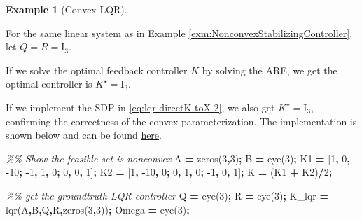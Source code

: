\documentclass[
]{book}
\newenvironment{Shaded}{\begin{snugshade}}{\end{snugshade}}
\newcommand{\CommentTok}[1]{\textcolor[rgb]{0.56,0.35,0.01}{\textit{#1}}}
\newcommand{\FloatTok}[1]{\textcolor[rgb]{0.00,0.00,0.81}{#1}}
\newcommand{\NormalTok}[1]{#1}
\newcommand{\OperatorTok}[1]{\textcolor[rgb]{0.81,0.36,0.00}{\textbf{#1}}}
\newcommand{\VariableTok}[1]{\textcolor[rgb]{0.00,0.00,0.00}{#1}}
\theoremstyle{definition}
\theoremstyle{definition}
\newtheorem{example}{Example}[chapter]
\theoremstyle{definition}
\theoremstyle{definition}
\theoremstyle{remark}
\begin{document}
\begin{example}[Convex LQR]
\protect\hypertarget{exm:ConvexLQR}{}\label{exm:ConvexLQR}

For the same linear system as in Example \ref{exm:NonconvexStabilizingController}, let \(Q = R = \mathrm{I}_3\).

If we solve the optimal feedback controller \(K\) by solving the ARE, we get the optimal controller is \(K^\star = \mathrm{I}_3\).

If we implement the SDP in \eqref{eq:lqr-directK-toX-2}, we also get \(K^\star = \mathrm{I}_3\), confirming the correctness of the convex parameterization. The implementation is shown below and can be found \href{https://github.com/ComputationalRobotics/Semidefinite-Examples/blob/main/lqr_sdp.m}{here}.

\begin{Shaded}
\begin{Highlighting}[]
\CommentTok{\%\% Show the feasible set is nonconvex}
\VariableTok{A} \OperatorTok{=} \VariableTok{zeros}\NormalTok{(}\FloatTok{3}\OperatorTok{,}\FloatTok{3}\NormalTok{)}\OperatorTok{;}
\VariableTok{B} \OperatorTok{=} \VariableTok{eye}\NormalTok{(}\FloatTok{3}\NormalTok{)}\OperatorTok{;}
\VariableTok{K1} \OperatorTok{=}\NormalTok{ [}\FloatTok{1}\OperatorTok{,} \FloatTok{0}\OperatorTok{,} \OperatorTok{{-}}\FloatTok{10}\OperatorTok{;} \OperatorTok{{-}}\FloatTok{1}\OperatorTok{,} \FloatTok{1}\OperatorTok{,} \FloatTok{0}\OperatorTok{;} \FloatTok{0}\OperatorTok{,} \FloatTok{0}\OperatorTok{,} \FloatTok{1}\NormalTok{]}\OperatorTok{;}
\VariableTok{K2} \OperatorTok{=}\NormalTok{ [}\FloatTok{1}\OperatorTok{,} \OperatorTok{{-}}\FloatTok{10}\OperatorTok{,} \FloatTok{0}\OperatorTok{;} \FloatTok{0}\OperatorTok{,} \FloatTok{1}\OperatorTok{,} \FloatTok{0}\OperatorTok{;} \OperatorTok{{-}}\FloatTok{1}\OperatorTok{,} \FloatTok{0}\OperatorTok{,} \FloatTok{1}\NormalTok{]}\OperatorTok{;}
\VariableTok{K} \OperatorTok{=}\NormalTok{ (}\VariableTok{K1} \OperatorTok{+} \VariableTok{K2}\NormalTok{)}\OperatorTok{/}\FloatTok{2}\OperatorTok{;}

\CommentTok{\%\% get the groundtruth LQR controller}
\VariableTok{Q} \OperatorTok{=} \VariableTok{eye}\NormalTok{(}\FloatTok{3}\NormalTok{)}\OperatorTok{;} \VariableTok{R} \OperatorTok{=} \VariableTok{eye}\NormalTok{(}\FloatTok{3}\NormalTok{)}\OperatorTok{;}
\VariableTok{K\_lqr} \OperatorTok{=} \VariableTok{lqr}\NormalTok{(}\VariableTok{A}\OperatorTok{,}\VariableTok{B}\OperatorTok{,}\VariableTok{Q}\OperatorTok{,}\VariableTok{R}\OperatorTok{,}\VariableTok{zeros}\NormalTok{(}\FloatTok{3}\OperatorTok{,}\FloatTok{3}\NormalTok{))}\OperatorTok{;}
\VariableTok{Omega} \OperatorTok{=} \VariableTok{eye}\NormalTok{(}\FloatTok{3}\NormalTok{)}\OperatorTok{;}


\end{Highlighting}
\end{Shaded}
\end{example}
\end{document}
